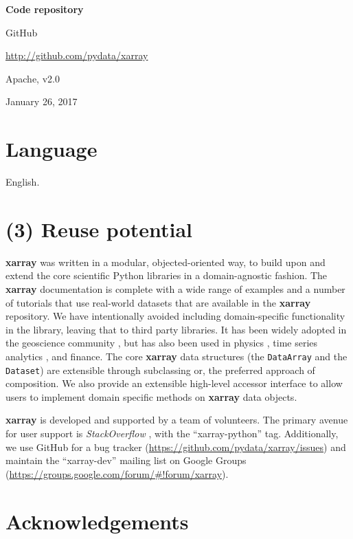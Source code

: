 \documentclass{jors}
\begin{document}
{\bf Code repository}

\begin{description}[noitemsep,topsep=0pt]
	\item[Name:] GitHub
	\item[Identifier:] \url{http://github.com/pydata/xarray}
	\item[Licence:] Apache, v2.0
	\item[Date published:] January 26, 2017
\end{description}

\section*{Language}

English.

\section*{(3) Reuse potential}

\textbf{xarray} was written in a modular, objected-oriented way, to build upon and extend the core scientific Python libraries in a domain-agnostic fashion.
The \textbf{xarray} documentation is complete with a wide range of examples and a number of tutorials that use real-world datasets that are available in the \textbf{xarray} repository.
We have intentionally avoided including domain-specific functionality in the library, leaving that to third party libraries.
It has been widely adopted in the geoscience community \citep[e.g.][]{xgcm,Dawson_2016a,Dawson_2016b}, but has also been used in physics \citep[e.g.][]{pycalphad}, time series analytics \citep{cesium}, and finance.
The core \textbf{xarray} data structures (the \verb|DataArray| and the \verb|Dataset|) are extensible through subclassing or, the preferred approach of composition.
We also provide an extensible high-level accessor interface to allow users to implement domain specific methods on \textbf{xarray} data objects.

\textbf{xarray} is developed and supported by a team of volunteers.
The primary avenue for user support is \textit{StackOverflow} \citep{stackoverflow}, with the ``xarray-python'' tag.
Additionally, we use GitHub for a bug tracker (\url{https://github.com/pydata/xarray/issues}) and maintain the ``xarray-dev'' mailing list on Google Groups (\url{https://groups.google.com/forum/#!forum/xarray}).

\section*{Acknowledgements}
\end{document}
